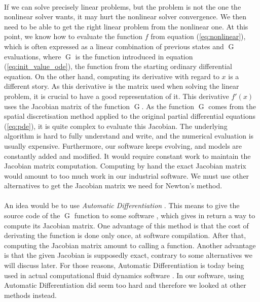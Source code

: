       \paragraph{}
      If we can solve precisely linear problems, but the problem is not the one the nonlinear solver wants, it may hurt the nonlinear solver convergence.
      We then need to be able to get the right linear problem from the nonlinear one.
      At this point, we know how to evaluate the function $f$ from equation (\ref{eq:nonlinear}), which is often expressed as a linear combination of previous states and $\operatorname{G}$ evaluations, where $\operatorname{G}$ is the function introduced in equation (\ref{eq:init_value_ode}), the function from the starting ordinary differential equation.
      On the other hand, computing its derivative with regard to $x$ is a different story.
      As this derivative is the matrix used when solving the linear problem, it is crucial to have a good representation of it.
      This derivative $f'\left(x\right)$ uses the Jacobian matrix of the function $\operatorname{G}$.
      As the function $\operatorname{G}$ comes from the spatial discretisation method applied to the original partial differential equations (\ref{eq:pde}), it is quite complex to evaluate this Jacobian.
      The underlying algorithm is hard to fully understand and write, and the numerical evaluation is usually expensive.
      Furthermore, our software keeps evolving, and models are constantly added and modified.
      It would require constant work to maintain the Jacobian matrix computation.
      Computing by hand the exact Jacobian matrix would amount to too much work in our industrial software.
      We must use other alternatives to get the Jacobian matrix we need for Newton's method.

      \paragraph{}
      An idea would be to use \emph{Automatic Differentiation} \cite{Griewank2000}.
      This means to give the source code of the $\operatorname{G}$ function to some software \cite{HascoetPascual2012}, which gives in return a way to compute its Jacobian matrix.
      One advantage of this method is that the cost of derivating the function is done only once, at software compilation.
      After that, computing the Jacobian matrix amount to calling a function.
      Another advantage is that the given Jacobian is supposedly exact, contrary to some alternatives we will discuss later.
      For those reasons, Automatic Differentiation is today being used in actual computational fluid dynamics software \cite{BilanceriBeuxElmahiEtAl2011, KenwayMaderHeEtAl2019}.
      In our software, using Automatic Differentiation did seem too hard and therefore we looked at other methods instead.

